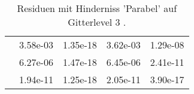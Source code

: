 \begin{table}
\begin{tabular}{c|cc|cc|}
\multicolumn{1}{|c|}{} & \multicolumn{1}{|c|}{  3.58e-03} & \multicolumn{1}{|c|}{  1.35e-18} & \multicolumn{1}{|c|}{  3.62e-03} & \multicolumn{1}{|c|}{  1.29e-08} \\ 
\multicolumn{1}{|c|}{} & \multicolumn{1}{|c|}{  6.27e-06} & \multicolumn{1}{|c|}{  1.47e-18} & \multicolumn{1}{|c|}{  6.45e-06} & \multicolumn{1}{|c|}{  2.41e-11} \\ 
\multicolumn{1}{|c|}{} & \multicolumn{1}{|c|}{  1.94e-11} & \multicolumn{1}{|c|}{  1.25e-18} & \multicolumn{1}{|c|}{  2.05e-11} & \multicolumn{1}{|c|}{  3.90e-17} \\ 
\hline 
\end{tabular}\caption{Residuen mit Hinderniss 'Parabel' auf Gitterlevel 3 .}\label{tab:Residuum_Parabel_level3}
\end{table} 
